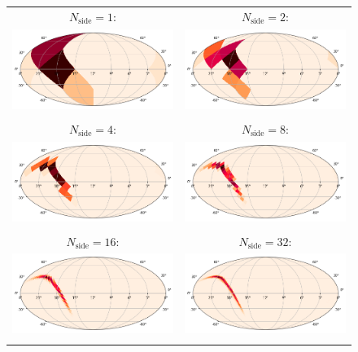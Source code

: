\begin{colsection}
\begin{colsection}
\begin{figure}[p]
\begin{center}
\begin{tabular}{cc}
$N_\text{side} = 1$: &
$N_\text{side} = 2$:
\\

\includegraphics[width=0.45\linewidth]{images/regrade/1.png} &
\includegraphics[width=0.45\linewidth]{images/regrade/2.png}
\\
\\

$N_\text{side} = 4$: &
$N_\text{side} = 8$:
\\

\includegraphics[width=0.45\linewidth]{images/regrade/4.png} &
\includegraphics[width=0.45\linewidth]{images/regrade/8.png}
\\
\\

$N_\text{side} = 16$: &
$N_\text{side} = 32$:
\\

\includegraphics[width=0.45\linewidth]{images/regrade/16.png} &
\includegraphics[width=0.45\linewidth]{images/regrade/32.png}
\\
\\


\end{tabular}
\end{center}
\end{figure}
\end{colsection}
\end{colsection}
